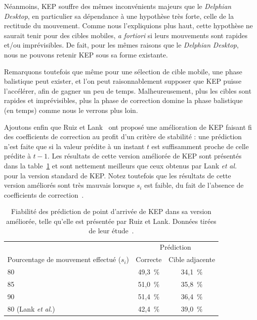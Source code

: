 	Néanmoins, KEP souffre des mêmes inconvénients majeurs que le \emph{Delphian Desktop}, en particulier sa dépendance à une hypothèse très forte, celle de la rectitude du mouvement. Comme nous l'expliquions plus haut, cette hypothèse ne saurait tenir pour des cibles mobiles, \emph{a fortiori} si leurs mouvements sont rapides et/ou imprévisibles. De fait, pour les mêmes raisons que le \emph{Delphian Desktop}, nous ne pouvons retenir KEP sous sa forme existante.
	
	Remarquons toutefois que même pour une sélection de cible mobile, une phase balistique peut exister, et l'on peut raisonnablement supposer que KEP puisse l'accélérer, afin de gagner un peu de temps. Malheureusement, plus les cibles sont rapides et imprévisibles, plus la phase de correction domine la phase balistique (en temps) comme nous le verrons plus loin.
	
	Ajoutons enfin que Ruiz et Lank~\cite{ruiz2009effects} ont proposé une amélioration de KEP faisant fi des coefficients de correction au profit d'un critère de stabilité : une prédiction n'est faite que si la valeur prédite à un instant $t$ est suffisamment proche de celle prédite à $t-1$. Les résultats de cette version améliorée de KEP sont présentés dans la table~\ref{tab:kepStable} et sont nettement meilleurs que ceux obtenus par Lank \emph{et al.} pour la version standard de KEP. Notez toutefois que les résultats de cette version améliorés sont très mauvais lorsque $s_{i}$ est faible, du fait de l'absence de coefficients de correction~\cite{ruiz2009effects}.
	
	\begin{table}
	\centering
	\begin{tabular}{l | c c}
														& \multicolumn{2}{c}{Prédiction}	\\
		Pourcentage de mouvement effectué ($s_{i}$)	& Correcte	& Cible adjacente	\bigstrut[b] \\ \hline
		80												& 49,3~\%{}	& 34,1~\%{}			\bigstrut[t] \\
		85												& 51,0~\%{}	& 35,8~\%{}			\\
		90												& 51,4~\%{}	& 36,4~\%{}			\\
		80 (Lank \emph{et al.})							& 42,4~\%{}	& 39,0~\%{}			\\
	\end{tabular}
	\caption[KEP stable -- fiabilité des prédictions]{Fiabilité des prédiction de point d'arrivée de KEP dans sa version améliorée, telle qu'elle est présentée par Ruiz et Lank. Données tirées de leur étude~\cite{ruiz2009effects}.}
	\label{tab:kepStable}
	\end{table}
		
